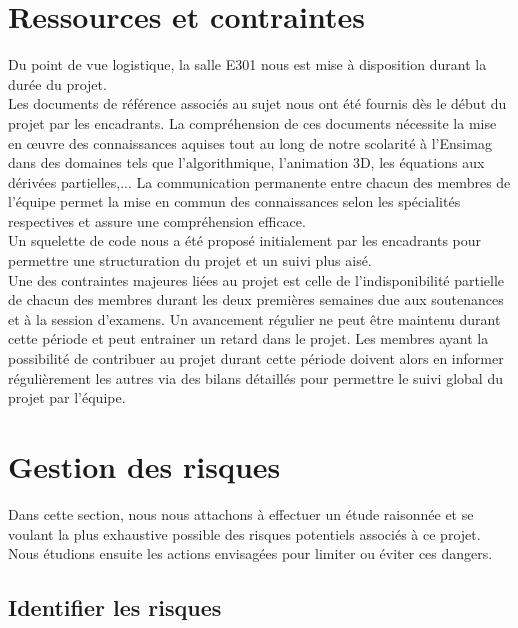 \documentclass[a4paper,11pt]{article}
\begin{document}
\section{Ressources et contraintes}

Du point de vue logistique, la salle E301 nous est mise à disposition durant la durée du projet.\\

Les documents de référence associés au sujet nous ont été fournis dès le début du projet par les encadrants. La compréhension de ces documents nécessite la mise en \oe{}uvre des connaissances aquises tout au long de notre scolarité à l'Ensimag dans des domaines tels que l'algorithmique, l'animation 3D, les équations aux dérivées partielles,... La communication permanente entre chacun des membres de l'équipe permet la mise en commun des connaissances selon les spécialités respectives et assure une compréhension efficace.\\

Un squelette de code nous a été proposé initialement par les encadrants pour permettre une structuration du projet et un suivi plus aisé.\\ 

Une des contraintes majeures liées au projet est celle de l'indisponibilité partielle de chacun des membres durant les deux premières semaines due aux soutenances et à la session d'examens. Un avancement régulier ne peut être maintenu durant cette période et peut entrainer un retard dans le projet. Les membres ayant la possibilité de contribuer au projet durant cette période doivent alors en informer régulièrement les autres via des bilans détaillés pour permettre le suivi global du projet par l'équipe.\\

\section{Gestion des risques}

Dans cette section, nous nous attachons à effectuer un étude raisonnée et se voulant la plus exhaustive possible des risques potentiels associés à ce projet. Nous étudions ensuite les actions envisagées pour limiter ou éviter ces dangers.\\

\subsection{Identifier les risques}
\end{document}
